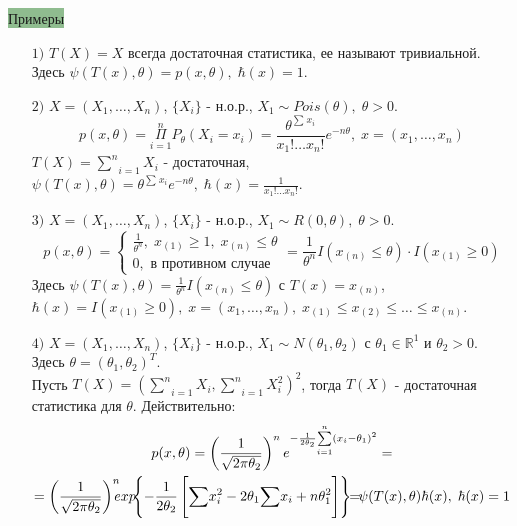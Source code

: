 \colorbox{DarkSeaGreen}{Примеры}\\

\begin{itemize}
	\item[$1)$]
		$T(X) = X$ всегда достаточная статистика, ее называют тривиальной. Здесь $\psi (T(x), \theta) = p(x, \theta), \; \hbar (x) = 1$.
	\item[$2)$]
		$X = (X_1, \dots, X_n)$, $\{X_i\}$ - н.о.р., $X_1 \sim Pois (\theta), \; \theta > 0$.
		$$p(x, \theta) = \underset{i=1}{\overset{n}{\Pi}} P_{\theta} (X_i = x_i) = \dfrac{\theta^{\underset{}{\overset{}{\sum}}x_i}}{x_1! \dots x_n!} e^{-n \theta}, \; x  = (x_1, \dots, x_n)$$
		$T(X) = \underset{i=1}{\overset{n}{\sum}}X_i$ - достаточная, $\displaystyle \psi (T(x), \theta) = \theta^{\underset{}{\overset{}{\sum}}x_i}e^{-n \theta}, \; \hbar (x) = \frac{1}{x_1! \dots x_n!}$.
	\item[$3)$]
		$X = (X_1, \dots, X_n)$, $\{X_i\}$ - н.о.р., $X_1 \sim R (0, \theta), \; \theta > 0$.
		$$p(x, \theta) = \begin{cases}
			\frac{1}{\theta^n}, \; x_{(1)} \ge 1, \; x_{(n)} \le \theta \\
			0, \text{ в противном случае}
		\end{cases} = \frac{1}{\theta^n} I(x_{(n)} \le \theta) \cdot I(x_{(1)} \ge 0)$$
		Здесь $\psi (T(x), \theta) = \frac{1}{\theta^n} I(x_{(n)} \le \theta)$ с $T(x) = x_{(n)}$, $\hbar (x) = I(x_{(1)} \ge 0), \; x = (x_1, \dots, x_n), \; x_{(1)} \le x_{(2)} \le \dots \le x_{(n)}$.
	\item[$4)$]
		$X = (X_1, \dots, X_n)$, $\{X_i\}$ - н.о.р., $X_1 \sim N(\theta_1, \theta_2)$ с $\theta_1 \in \mathbb{R}^1$ и $\theta_2 > 0$. Здесь $\theta = (\theta_1, \theta_2)^T$. \\
		Пусть $\displaystyle T(X) = \left( \underset{i=1}{\overset{n}{\sum}}X_i, \underset{i=1}{\overset{n}{\sum}}X_i^2 \right)^2$, тогда $T(X)$ - достаточная статистика для $\theta$. Действительно:
		$$\begin{gathered}
			p(x, \theta) = \left( \frac{1}{\sqrt{2 \pi \theta_2}} \right)^n e^{-\frac{1}{2 \theta_2} \underset{i=1}{\overset{n}{\sum}}(x_i - \theta_1)^2} = \\
			= \left( \frac{1}{\sqrt{2 \pi \theta_2}} \right)^n \hspace{-6pt}exp \hspace{-4pt}\left\{ -\frac{1}{2 \theta_2} \left[ \underset{}{\overset{}{\sum}}x_i^2 - 2 \theta_1 \underset{}{\overset{}{\sum}}x_i + n \theta_1^2 \right] \right\} \hspace{-4pt}= \hspace{-4pt}\psi (T(x), \theta) \hbar(x), \; \hbar(x) = 1

\end{gathered}$$
\end{itemize}
